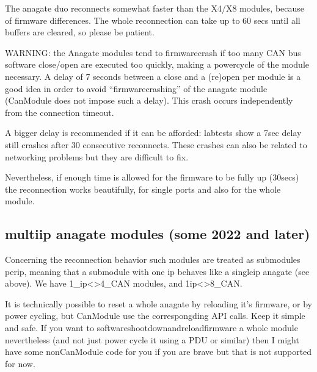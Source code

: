 \documentclass[a4paper,10pt,english]{sphinxmanual}
\begin{document}
\sphinxAtStartPar
The anagate duo reconnects somewhat faster than the X4/X8 modules, because of firmware differences.
The whole reconnection can take up to 60 secs until all buffers are cleared, so please be patient.

\sphinxAtStartPar
WARNING: the Anagate modules tend to firmware\sphinxhyphen{}crash if too many CAN bus software close/open are
executed too quickly, making a power\sphinxhyphen{}cycle of the module necessary. A delay of 7 seconds
between a close and a (re\sphinxhyphen{})open per module is a good idea in order to avoid
“firmware\sphinxhyphen{}crashing” of the anagate module (CanModule does not impose such a delay).
This crash occurs independently from the connection timeout.

\sphinxAtStartPar
A bigger delay is recommended if it can be afforded: lab\sphinxhyphen{}tests show a 7sec delay still crashes
after 30 consecutive reconnects. These crashes can also be related to networking problems but
they are difficult to fix.

\sphinxAtStartPar
Nevertheless, if enough time is allowed for the firmware to be fully up (30secs) the reconnection
works beautifully, for single ports and also for the whole module.


\subsection{multi\sphinxhyphen{}ip anagate modules (some 2022 and later)}
\label{\detokenize{reconnection:multi-ip-anagate-modules-some-2022-and-later}}
\sphinxAtStartPar
Concerning the reconnection behavior such modules are treated as submodules per\sphinxhyphen{}ip, meaning that a sub\sphinxhyphen{}module with one ip
behaves like a single\sphinxhyphen{}ip anagate (see above). We have 1\_ip\textless{}\sphinxhyphen{}\textgreater{}4\_CAN modules, and 1\sphinxhyphen{}ip\textless{}\sphinxhyphen{}\textgreater{}8\_CAN.

\sphinxAtStartPar
It is technically possible to reset a whole anagate by reloading
it’s firmware, or by power cycling, but CanModule  use the correspongding API calls. Keep it simple and safe.
If you want to software\sphinxhyphen{}shoot\sphinxhyphen{}down\sphinxhyphen{}and\sphinxhyphen{}reload\sphinxhyphen{}firmware a whole module nevertheless
(and not just power cycle it using a PDU or similar) then I might have some non\sphinxhyphen{}CanModule code for you if
you are brave \sphinxhyphen{} but that is not supported for now.
\end{document}
